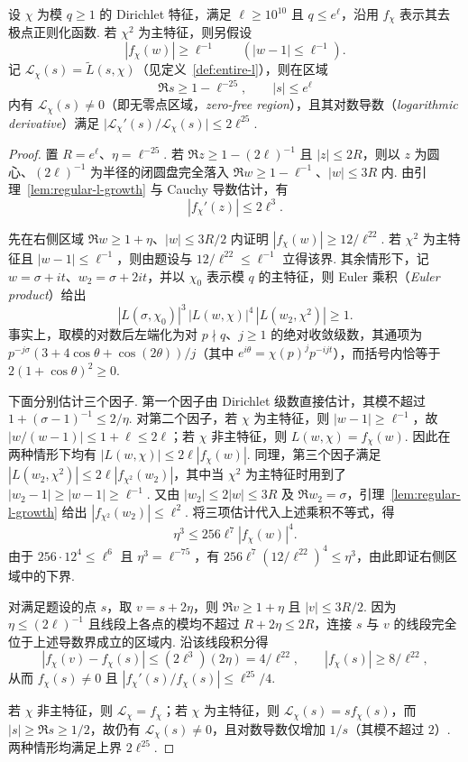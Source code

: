 \begin{lemma}[带对数导数界的一致无零点区域]
\label{lem:zero-free-region}
\emitthmsource
设 $\chi$ 为模 $q\ge1$ 的 Dirichlet 特征，满足 $\ell\ge10^{10}$ 且 $q\le e^\ell$，沿用 $f_\chi$ 表示其去极点正则化函数. 若 $\chi^2$ 为主特征，则另假设
\[
 |f_\chi(w)|\ge\ell^{-1}\qquad (|w-1|\le\ell^{-1}).
\]
记 $\mathcal L_\chi(s)=\widetilde L(s,\chi)$（见定义~\ref{def:entire-l}），则在区域
\[
 \Re s\ge 1-\ell^{-25},\qquad |s|\le e^\ell
\]
内有 $\mathcal L_\chi(s)\ne0$（即无零点区域，\emph{zero-free region}），且其对数导数（\emph{logarithmic derivative}）满足 $\bigl|\mathcal L_\chi'(s)/\mathcal L_\chi(s)\bigr|\le2\ell^{25}$.
\end{lemma}

\begin{proof}
置 $R=e^\ell$、$\eta=\ell^{-25}$. 若 $\Re z\ge1-(2\ell)^{-1}$ 且 $|z|\le2R$，则以 $z$ 为圆心、$(2\ell)^{-1}$ 为半径的闭圆盘完全落入
$\Re w\ge1-\ell^{-1}$、$|w|\le3R$ 内. 由引理~\ref{lem:regular-l-growth} 与 Cauchy 导数估计，有
\[
 |f_\chi'(z)|\le 2\ell^3.
\]

先在右侧区域 $\Re w\ge1+\eta$、$|w|\le 3R/2$ 内证明 $|f_\chi(w)|\ge12/\ell^{22}$.
若 $\chi^2$ 为主特征且 $|w-1|\le\ell^{-1}$，则由题设与 $12/\ell^{22}\le\ell^{-1}$ 立得该界.
其余情形下，记 $w=\sigma+it$、$w_2=\sigma+2it$，并以 $\chi_0$ 表示模 $q$ 的主特征，则 Euler 乘积（\emph{Euler product}）给出
\[
 |L(\sigma,\chi_0)|^3\,|L(w,\chi)|^4\,|L(w_2,\chi^2)|\ge1.
\]
事实上，取模的对数后左端化为对 $p\nmid q$、$j\ge1$ 的绝对收敛级数，其通项为
$p^{-j\sigma}(3+4\cos\theta+\cos(2\theta))/j$（其中
$e^{i\theta}=\chi(p)^j p^{-ijt}$），而括号内恰等于 $2(1+\cos\theta)^2\ge0$.

下面分别估计三个因子. 第一个因子由 Dirichlet 级数直接估计，其模不超过
$1+(\sigma-1)^{-1}\le2/\eta$.
对第二个因子，若 $\chi$ 为主特征，则 $|w-1|\ge\ell^{-1}$，故
$|w/(w-1)|\le1+\ell\le2\ell$；若 $\chi$ 非主特征，则 $L(w,\chi)=f_\chi(w)$.
因此在两种情形下均有 $|L(w,\chi)|\le2\ell|f_\chi(w)|$.
同理，第三个因子满足 $|L(w_2,\chi^2)|\le2\ell|f_{\chi^2}(w_2)|$，其中当 $\chi^2$ 为主特征时用到了
$|w_2-1|\ge|w-1|\ge\ell^{-1}$. 又由 $|w_2|\le2|w|\le3R$ 及 $\Re w_2=\sigma$，引理~\ref{lem:regular-l-growth} 给出
$|f_{\chi^2}(w_2)|\le\ell^2$. 将三项估计代入上述乘积不等式，得
\[
 \eta^3\le 256\ell^7 |f_\chi(w)|^4.
\]
由于 $256\cdot12^4\le\ell^6$ 且 $\eta^3=\ell^{-75}$，有
$256\ell^7(12/\ell^{22})^4\le\eta^3$，由此即证右侧区域中的下界.

对满足题设的点 $s$，取 $v=s+2\eta$，则 $\Re v\ge1+\eta$ 且 $|v|\le3R/2$.
因为 $\eta\le(2\ell)^{-1}$ 且线段上各点的模均不超过 $R+2\eta\le2R$，连接 $s$ 与 $v$ 的线段完全位于上述导数界成立的区域内. 沿该线段积分得
\[
 |f_\chi(v)-f_\chi(s)|\le(2\ell^3)(2\eta)=4/\ell^{22},
 \qquad |f_\chi(s)|\ge 8/\ell^{22},
\]
从而 $f_\chi(s)\ne0$ 且 $|f_\chi'(s)/f_\chi(s)|\le\ell^{25}/4$.

若 $\chi$ 非主特征，则 $\mathcal L_\chi=f_\chi$；若 $\chi$ 为主特征，则 $\mathcal L_\chi(s)=s f_\chi(s)$，而 $|s|\ge\Re s\ge1/2$，故仍有 $\mathcal L_\chi(s)\ne0$，且对数导数仅增加 $1/s$（其模不超过 $2$）. 两种情形均满足上界 $2\ell^{25}$.
\end{proof}

